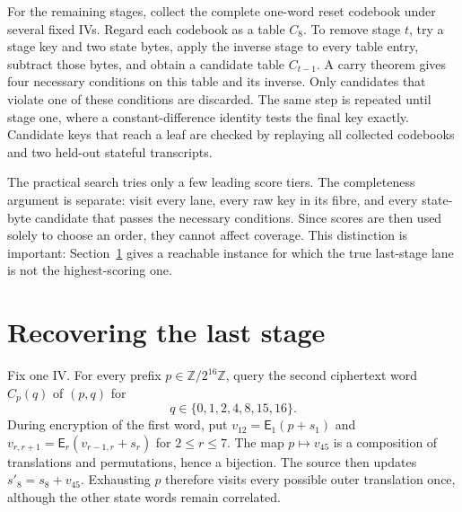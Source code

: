 \documentclass[10pt]{article}
\theoremstyle{plain}
\theoremstyle{definition}
\theoremstyle{remark}
\newcommand{\W}{\mathbb Z/2^{16}\mathbb Z}
\newcommand{\E}{\mathsf E}
\begin{document}
For the remaining stages, collect the complete one-word reset codebook under
several fixed IVs.  Regard each codebook as a table \(C_8\).  To remove stage
\(t\), try a stage key and two state bytes, apply the inverse stage to every
table entry, subtract those bytes, and obtain a candidate table \(C_{t-1}\).
A carry theorem gives four necessary conditions on this table and its inverse.
Only candidates that violate one of these conditions are discarded.  The
same step is repeated until stage one, where a constant-difference identity
tests the final key exactly.  Candidate keys that reach a leaf are checked by
replaying all collected codebooks and two held-out stateful transcripts.

The practical search tries only a few leading score tiers.  The completeness
argument is separate: visit every lane, every raw key in its fibre, and every
state-byte candidate that passes the necessary conditions.  Since scores are
then used solely to choose an order, they cannot affect coverage.  This
distinction is important: Section~\ref{sec:outer} gives a reachable instance
for which the true last-stage lane is not the highest-scoring one.

\section{Recovering the last stage}
\label{sec:outer}

Fix one IV.  For every prefix \(p\in\W\), query the second ciphertext word
\(C_p(q)\) of \((p,q)\) for
\begin{equation}
q\in\{0,1,2,4,8,15,16\}.
\label{eq:probes}
\end{equation}
During encryption of the first word, put
\(v_{12}=\E_1(p+s_1)\) and
\(v_{r,r+1}=\E_r(v_{r-1,r}+s_r)\) for \(2\leq r\leq7\).
The map \(p\mapsto v_{45}\) is a composition of translations and
permutations, hence a bijection.  The source then updates
\(s'_8=s_8+v_{45}\).  Exhausting \(p\) therefore visits every possible outer
translation once, although the other state words remain correlated.
\end{document}
